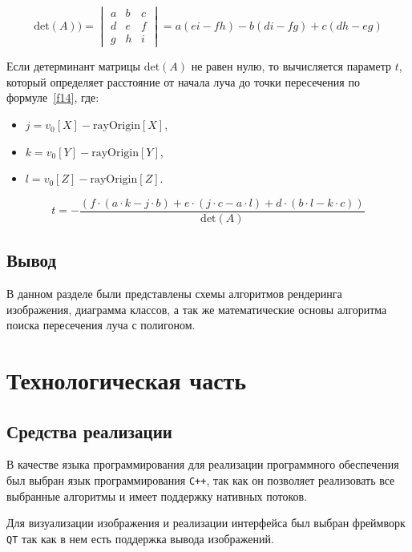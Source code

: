 \begin{equation}
\text{det}(A)) = 
\begin{vmatrix}
a & b & c \\
d & e & f \\
g & h & i
\end{vmatrix} = a(ei - fh) - b(di - fg) + c(dh - eg)
\label{f13}
\end{equation}

Если детерминант матрицы \(\text{det}(A)\) не равен нулю, то вычисляется параметр \(t\), который определяет расстояние от начала луча до точки пересечения по формуле~\ref{f14}, где:
\begin{itemize}
    \item \(j = v_0[X] - \text{rayOrigin}[X]\),
    \item \(k = v_0[Y] - \text{rayOrigin}[Y]\),
    \item \(l = v_0[Z] - \text{rayOrigin}[Z]\).
\end{itemize}

\begin{equation}
t = - \frac{(f \cdot (a \cdot k - j \cdot b) + e \cdot (j \cdot c - a \cdot l) + d \cdot (b \cdot l - k \cdot c))}{\text{det}(A)}
\label{f14}
\end{equation}

\section{Вывод}
В данном разделе были представлены схемы алгоритмов рендеринга изображения, диаграмма классов, а так же математические основы алгоритма поиска пересечения луча с полигоном.

\chapter{Технологическая часть}
\section{Средства реализации}
В качестве языка программирования для реализации программного
обеспечения был выбран язык программирования \texttt{C++}, так как он позволяет реализовать все выбранные алгоритмы и имеет поддержку нативных потоков.

Для визуализации изображения и реализации интерфейса был выбран фреймворк \texttt{QT} так как в нем есть поддержка вывода изображений.


\renewcommand\bibname{СПИСОК ИСПОЛЬЗОВАННЫХ ИСТОЧНИКОВ}




